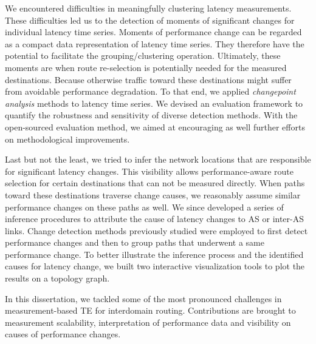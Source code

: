 We encountered difficulties in meaningfully clustering latency measurements. 
These difficulties led us to the detection of moments of significant changes for individual latency time series.
Moments of performance change can be regarded as a compact data representation of latency time series. They therefore have the potential to facilitate the grouping/clustering operation.
Ultimately, these moments are when route re-selection is potentially needed for the measured destinations.
Because otherwise traffic toward these destinations might suffer from avoidable performance degradation.
To that end, we applied \textit{changepoint analysis} methods to latency time series.
We devised an evaluation framework to quantify the robustness and sensitivity of diverse detection methods.
With the open-sourced evaluation method, we aimed at encouraging as well further efforts on methodological improvements.

Last but not the least, we tried to infer the network locations that are responsible for significant latency changes. This visibility allows performance-aware route selection for certain destinations that can not be measured directly.
When paths toward these destinations traverse change causes, we reasonably assume similar performance changes on these paths as well.
We since developed a series of inference procedures to attribute the cause of latency changes to \acf{AS} or inter-AS links.
Change detection methods previously studied were employed to first detect performance changes and then to group paths that underwent a same performance change.
To better illustrate the inference process and the identified causes for latency change, we built two interactive visualization tools to plot the results on a topology graph.

In this dissertation, we tackled some of the most pronounced challenges in measurement-based TE for interdomain routing. Contributions are brought to measurement scalability, interpretation of performance data and visibility on causes of performance changes. 
\vfill

\newpage


